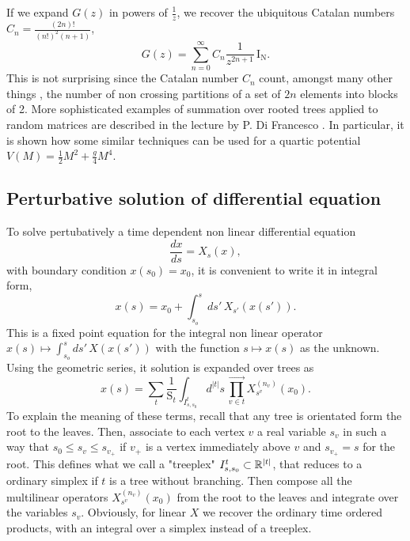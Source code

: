\documentclass[10pt,here,feynmf]{article}
\begin{document}
If we expand $G(z)$ in powers of $\frac{1}{z}$, we recover the ubiquitous Catalan numbers $C_{n}=\frac{(2n)!}{(n!)^{2}(n+1)}$,
\begin{equation}
G(z)=\sum_{n=0}^{\infty}C_{n}\frac{1}{z^{2n+1}}\,\mathrm{I_{N}}.
\end{equation}
This is not surprising since the Catalan number $C_{n}$ count, amongst many other things \cite{stanley}, the number of non crossing partitions of a set of $2n$ elements into blocks of 2. More sophisticated examples of summation over rooted trees applied to random matrices are described in the lecture by P. Di Francesco \cite{difrancesco}. In particular, it is shown how some similar techniques can be used for a quartic potential $V(M)=\frac{1}{2}M^{2}+\frac{g}{4}M^{4}$.



\subsection{Perturbative solution of differential equation}

\label{diffsec}

To solve pertubatively a time dependent non linear differential equation
\begin{equation}
\frac{dx}{ds}=X_{s}(x),\label{timede}
\end{equation}
with boundary condition $ x(s_{0})=x_{0}$, it is convenient to write it in integral form,
\begin{equation}
x(s)=x_{0}+\int_{s_{o}}^{s}ds'\, X_{s'}(x(s')).
\end{equation}
This is a fixed point equation for the integral non linear operator $x(s)\mapsto\int_{s_{o}}^{s}ds'\, X(x(s'))$ with the function $s\mapsto x(s)$ as the unknown. Using the geometric series, it solution is expanded over trees as
\begin{equation} 
x(s)=\sum_{t}\frac{1}{\mathrm{S}_{t}}\int_{I^{t}_{s,s_{0}}}\!\!d^{|t|}s\,
\prod_{v\in t}^{\longrightarrow}X_{s^{v}}^{(n_{v})}(x_{0}).
\end{equation}
To explain the meaning of these terms, recall that any tree is orientated form the root to the leaves. Then, associate to each vertex $v$ a real variable  $s_{v}$ in such a way that $s_{0}\leq s_{v}\leq s_{v_{+}}$ if $v_{+}$ is a vertex immediately above $v$  and $s_{v_{+}}=s$ for the root. This defines what we call a  "treeplex" $I^{t}_{s,s_{0}}\subset{\Bbb R}^{|t|}$, that reduces to a ordinary simplex if  $t$ is a  tree without branching. Then compose all the multilinear operators $X_{s^{v}}^{(n_{v})}(x_{0})$ from the root to the leaves and integrate over the variables $s_{v}$. Obviously, for linear $X$ we recover the ordinary time ordered products, with an integral over a simplex instead of a treeplex. 
\end{document}
